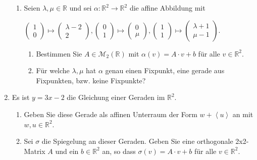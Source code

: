 \documentclass[a4paper]{article}
\begin{document}
\begin{enumerate}
\begin{enumerate}[label=(\alph*)]
			\item Seien $\lambda, \mu \in \mathbb{R}$ und sei $\alpha :\mathbb{R}^2 \rightarrow \mathbb{R}^2$ die affine Abbildung mit 
			\begin{center}
			$\begin{pmatrix} 1 \\ 0 \end{pmatrix} \mapsto \begin{pmatrix} \lambda -2 \\ 2 \end{pmatrix}, \begin{pmatrix} 0 \\ 1 \end{pmatrix} \mapsto \begin{pmatrix} 0 \\ \mu \end{pmatrix} , \begin{pmatrix} 1 \\ 1 \end{pmatrix} \mapsto \begin{pmatrix} \lambda + 1 \\ \mu - 1 \end{pmatrix} $.
			\end{center}
				\begin{enumerate}
				\item Bestimmen Sie $A \in \mathcal{M}_2(\mathbb{R})$ mit $\alpha(v) = A \cdot v +b$ für alle $v \in \mathbb{R}^2$.
				\item Für welche $\lambda, \mu$ hat $\alpha$ genau einen Fixpunkt, eine gerade aus Fixpunkten, bzw. keine Fixpunkte?
				\end{enumerate}

		\end{enumerate}

\item Es ist $y=3x-2$ die Gleichung einer Geraden im $\mathbb{R}^2$.
	\begin{enumerate}[label=(\alph*)]
		\item Geben Sie diese Gerade als affinen Unterraum der Form $w + \left\langle u \right \rangle$ an mit $w,u \in \mathbb{R}^2$.
		\item Sei $\sigma$ die Spiegelung an dieser Geraden. Geben Sie eine orthogonale 2x2-Matrix $A$ und ein $b \in \mathbb{R}^2$ an, so dass $\sigma(v) = A \cdot v + b$ für alle $v \in \mathbb{R}^2$.
	\end{enumerate}

\end{enumerate}
\end{document}
